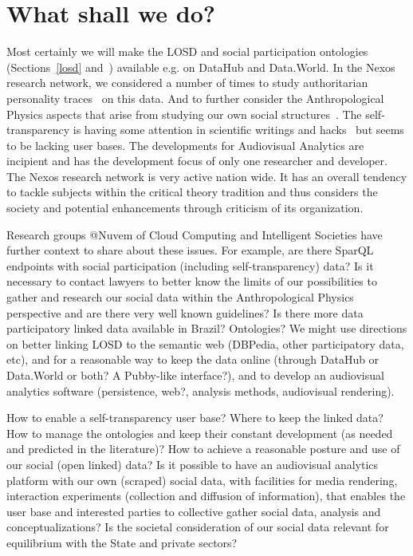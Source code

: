 \documentclass[letterpaper,10pt]{article}
\begin{document}
\section{What shall we do?}
Most certainly we will
make the LOSD and social participation ontologies (Sections~\ref{losd} and~\cite{ont})
available e.g. on DataHub and Data.World.
In the Nexos research network, we
considered a number of times to study authoritarian personality traces~\cite{au}
on this data.
And to further consider the Anthropological Physics aspects that
arise from studying our own social structures~\cite{af,af2}.
The self-transparency is having some attention in scientific writings
and hacks~\cite{aa,aa2} but seems to be lacking user bases.
The developments for Audiovisual Analytics are incipient
and has the development focus of only one researcher and developer.
The Nexos research network is very active nation wide.
It has an overall tendency to tackle subjects within the
critical theory tradition and thus considers the society
and potential enhancements through criticism of its organization.

Research groups @Nuvem of Cloud Computing and Intelligent Societies have 
further context to share about these issues.
For example, are there SparQL endpoints with social participation
(including self-transparency) data?
Is it necessary to contact lawyers to
better know the limits of our possibilities
to gather and research our social data within
the Anthropological Physics perspective
and are there very well known guidelines?
Is there more data participatory linked data available
in Brazil? Ontologies?
We might use directions 
on better linking LOSD to the semantic web
(DBPedia, other participatory data, etc),
and for a reasonable way to keep the data online
(through DataHub or Data.World or both?
A Pubby-like interface?),
and to develop an audiovisual analytics
software
(persistence, web?, analysis methods, audiovisual rendering).

How to enable a self-transparency user base?
Where to keep the linked data?
How to manage the ontologies and keep their
constant development (as needed and predicted in the literature)?
How to achieve a reasonable posture
and use of our social (open linked) data?
Is it possible to have an audiovisual analytics
platform with our own (scraped) social data,
with facilities for media rendering,
interaction experiments (collection and diffusion of information),
that enables the user base and interested parties to
collective gather social data, analysis and conceptualizations?
Is the societal consideration of our social data
relevant for equilibrium with the State and private sectors?
\end{document}
